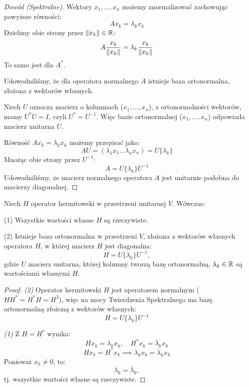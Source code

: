\begin{proof}[Dowód (Spektralne)]
Wektory $x_1, \ldots, x_n$ możemy znormalizować zachowując powyższe równości:
$$ Ax_k = \lambda_k x_k $$
Dzielimy obie strony przez $\left\| x_k \right\| \in \mathbb{R}$:
$$ A \frac{x_k}{\left\| x_k \right\|} = \lambda_k \frac{x_k}{\left\| x_k \right\|} $$
To samo jest dla $A^*$.

Udowodniliśmy, że dla operatora normalnego $A$ istnieje baza ortonormalna, złożona z wektorów własnych.

Niech $U$ oznacza macierz o kolumnach ($x_1, \ldots, x_n$), z ortonormalności wektorów, mamy $U^*U = I$, czyli $U^* = U^{-1}$. Więc bazie ortonormalnej ($x_1, \ldots, x_n$) odpowiada macierz unitarna $U$.

Równość $Ax_k = \lambda_k x_k$ możemy przepisać jako:
$$AU = (\lambda_1 x_1 \ldots \lambda_n x_n) = U\{\lambda_k\} $$
Mnożąc obie strony przez $U^{-1}$:
$$A = U\{\lambda_k\}U^{-1}$$
Udowodniliśmy, że macierz normalnego operatora $A$ jest unitarnie podobna do macierzy diagonalnej.   
\end{proof}

\begin{theorem}\label{theorem:hermitian_spectral}
    Niech $H$ operator hermitowski w przestrzeni unitarnej $V$.
    Wówczas:

    (1) Wszystkie wartości własne $H$ są rzeczywiste.

    (2) Istnieje baza ortonormalna w przestrzeni $V$, złożona z wektorów własnych operatora $H$, w której macierz $H$ jest diagonalna:
    $$H = U\{\lambda_k\}U^{-1},$$
    gdzie $U$ macierz unitarna, której kolumny tworzą bazę ortonormalną, $\lambda_k \in \mathbb{R}$ są wartościami własnymi $H$.
\end{theorem}
\begin{proof}
\textit{(2)} Operator hermitowski $H$ jest operatorem normalnym ($HH^* = H^*H = H^2$), więc na mocy Twierdzenia Spektralnego ma bazę ortonormalną złożoną z wektorów własnych:
$$H = U\{\lambda_k\}U^{-1}$$

\textit{(1)} Z $H = H^*$ wynika:
$$Hx_k = \lambda_k x_k, \quad H^*x_k = \bar{\lambda}_k x_k$$
$$Hx_k = H^*x_k \implies \lambda_k x_k = \bar{\lambda}_k x_k$$
Ponieważ $x_k \neq 0$, to:
$$ \lambda_k = \bar{\lambda}_k, $$
tj. wszystkie wartości własne są rzeczywiste.
\end{proof}

